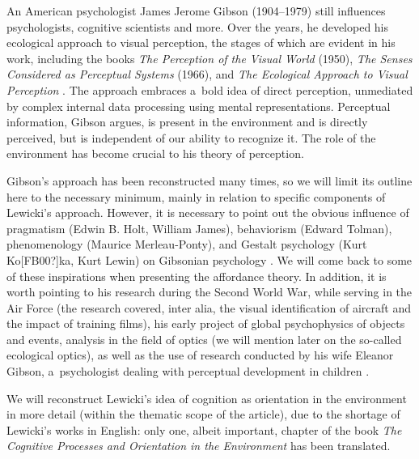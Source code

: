An American psychologist James Jerome Gibson (1904–1979) still influences psychologists, cognitive scientists and more. Over the years, he developed his ecological approach to visual perception, the stages of which are evident in his work, including the books \textit{The Perception of the Visual World} (1950), \textit{The Senses Considered as Perceptual Systems} (1966), and \textit{The Ecological Approach to Visual Perception} 
\parencite*[][]{}. %
 The approach embraces a~bold idea of direct perception, unmediated by complex internal data processing using mental representations. Perceptual information, Gibson argues, is present in the environment and is directly perceived, but is independent of our ability to recognize it. The role of the environment has become crucial to his theory of perception.



Gibson's approach has been reconstructed many times, so we will limit its outline here to the necessary minimum, mainly in relation to specific components of Lewicki's approach. However, it is necessary to point out the obvious influence of pragmatism (Edwin B. Holt, William James), behaviorism (Edward Tolman), phenomenology (Maurice Merleau-Ponty), and Gestalt psychology (Kurt Ko[FB00?]ka, Kurt Lewin) on Gibsonian psychology 
\parencite[see][]{lobo_history_2018}. %
 We will come back to some of these inspirations when presenting the affordance theory. In addition, it is worth pointing to his research during the Second World War, while serving in the Air Force (the research covered, inter alia, the visual identification of aircraft and the impact of training films), his early project of global psychophysics of objects and events, analysis in the field of optics (we will mention later on the so-called ecological optics), as well as the use of research conducted by his wife Eleanor Gibson, a~psychologist dealing with perceptual development in children 
\parencites[][]{gibson_principles_1969}[][]{hochberg_james_1994}[][]{heft_ecological_2001}[][]{lobo_history_2018}.%




We will reconstruct Lewicki's idea of cognition as orientation in the environment in more detail (within the thematic scope of the article), due to the shortage of Lewicki's works in English: only one, albeit important, chapter of the book \textit{The Cognitive Processes and Orientation in the Environment} 
\parencite*[][]{} %
 has been translated.



